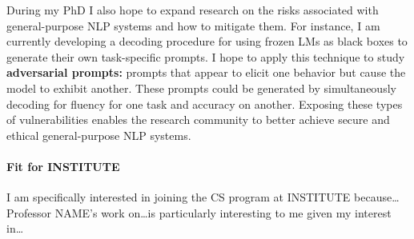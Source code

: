 \documentclass[11pt]{article}
\newcommand\inst{INSTITUTE\xspace}
\begin{document}
During my PhD I also hope to expand research on the risks associated 
with general-purpose NLP systems and how to mitigate them.
For instance, I am currently developing a decoding procedure 
for using frozen LMs as black boxes
to generate their own task-specific prompts.
I hope to apply this technique
to study \textbf{adversarial prompts:}
prompts that appear to elicit one behavior 
but cause the model to exhibit another.
These prompts could be generated by simultaneously 
decoding for fluency for one task and accuracy on another.
Exposing these types of vulnerabilities
enables the research community to better achieve
secure and ethical general-purpose NLP systems. 

\paragraph{Fit for \inst} I am specifically interested in joining the CS program at 
\inst because\ldots Professor NAME's work on\ldots is particularly interesting to me given my interest in\ldots



\end{document}
